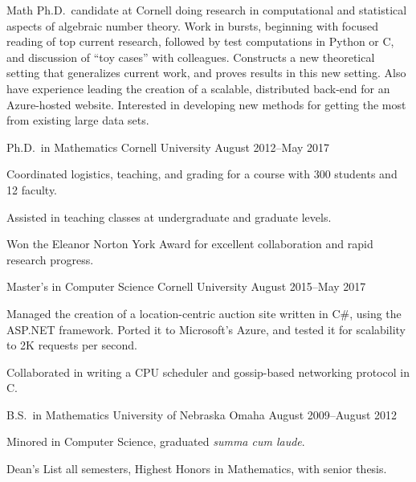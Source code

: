 \documentclass[11pt, letterpaper]{awesome-cv}
\begin{document}
\makecvheader





\begin{cvparagraph}

Math Ph.D.~candidate at Cornell doing research in computational and statistical aspects of algebraic number theory. Work in bursts, beginning with focused reading of top current research, followed by test computations in Python or C, and discussion of ``toy cases'' with colleagues. Constructs a new theoretical setting that generalizes current work, and proves results in this new setting. Also have experience leading the creation of a scalable, distributed back-end for an Azure-hosted website. Interested in developing new methods for getting the most from existing large data sets. 
\end{cvparagraph}






\begin{cventries}

\cventry
	{Ph.D.~in Mathematics}
	{Cornell University}
	{}
	{August 2012--May 2017}
	{
		\begin{cvitems}
			\item{Coordinated logistics, teaching, and grading for a course with 300 students and 12 faculty.}
			\item{Assisted in teaching classes at undergraduate and graduate levels.}
			\item{Won the Eleanor Norton York Award for excellent collaboration and rapid research progress.}
		\end{cvitems}
	}
	
\cventry
	{Master's in Computer Science}
	{Cornell University}
	{}
	{August 2015--May 2017}
	{
		\begin{cvitems}
			\item{Managed the creation of a location-centric auction site written in C\#, using the ASP.NET framework. Ported it to Microsoft's Azure, and tested it for scalability to 2K requests per second.}
			\item{Collaborated in writing a CPU scheduler and gossip-based networking protocol in C.}
		\end{cvitems}
	}
	
\cventry
	{B.S.~in Mathematics}
	{University of Nebraska Omaha}
	{}
	{August 2009--August 2012}
	{
		\begin{cvitems}
			\item{Minored in Computer Science, graduated \emph{summa cum laude}.}
			\item{Dean's List all semesters, Highest Honors in Mathematics, with senior thesis.}
		\end{cvitems}
	}
	
\end{cventries}
\end{document}
